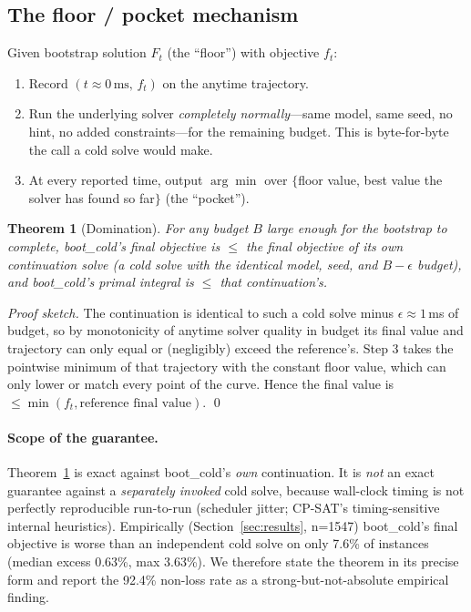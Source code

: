 \documentclass[11pt]{article}                        %
\newtheorem{theorem}{Theorem}
\begin{document}
\subsection{The floor / pocket mechanism}
Given bootstrap solution $F_t$ (the ``floor'') with objective $f_t$:
\begin{enumerate}
  \item Record $(t{\approx}0\,\text{ms},\, f_t)$ on the anytime trajectory.
  \item Run the underlying solver \emph{completely normally}---same model, same
  seed, no hint, no added constraints---for the remaining budget. This is
  byte-for-byte the call a cold solve would make.
  \item At every reported time, output $\arg\min$ over $\{$floor value, best
  value the solver has found so far$\}$ (the ``pocket'').
\end{enumerate}

\begin{theorem}[Domination]
\label{thm:dom}
For any budget $B$ large enough for the bootstrap to complete, boot\_cold's
final objective is $\le$ the final objective of its own continuation solve
(a cold solve with the identical model, seed, and $B-\epsilon$ budget), and
boot\_cold's primal integral is $\le$ that continuation's.
\end{theorem}
\begin{proof}[Proof sketch]
The continuation is identical to such a cold solve minus $\epsilon{\approx}1$\,ms
of budget, so by monotonicity of anytime solver quality in budget its final
value and trajectory can only equal or (negligibly) exceed the reference's.
Step 3 takes the pointwise minimum of that trajectory with the constant floor
value, which can only lower or match every point of the curve. Hence the final
value is $\le \min(f_t, \text{reference final value})$. \qed
\end{proof}

\paragraph{Scope of the guarantee.}
Theorem~\ref{thm:dom} is exact against boot\_cold's \emph{own} continuation. It
is \emph{not} an exact guarantee against a \emph{separately invoked} cold solve,
because wall-clock timing is not perfectly reproducible run-to-run (scheduler
jitter; CP-SAT's timing-sensitive internal heuristics). Empirically
(Section~\ref{sec:results}, n{=}1547) boot\_cold's final objective is worse than
an independent cold solve on only 7.6\% of instances (median excess 0.63\%, max
3.63\%). We therefore state the theorem in its precise form and report the
92.4\% non-loss rate as a strong-but-not-absolute empirical finding.
\end{document}
